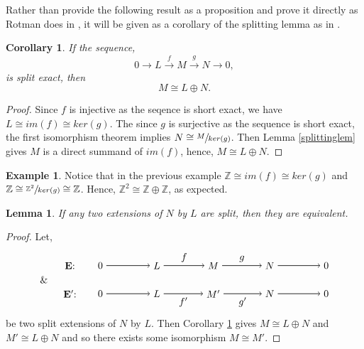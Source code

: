 \documentclass[11.5pt, twoside, a4paper, titlepage]{report}
\providecommand{\bb}[1]{\mathbb{#1}}
\theoremstyle{definition}
\newtheorem{eg}[mydef]{Example}
\theoremstyle{plain}
\newtheorem{lem}[mydef]{Lemma}
\newtheorem{cor}[mydef]{Corollary}
\begin{document}
Rather than provide the following result as a proposition and prove it directly as Rotman does in \cite{Rotman}, it will be given as a corollary of the splitting lemma as in \cite{Schiff}.

\begin{cor} \label{MLNcor}
If the sequence,
\begin{equation*}
0\xrightarrow{}L\xrightarrow{f} M \xrightarrow{g} N \xrightarrow{} 0,
\end{equation*}
is split exact, then
\begin{equation*}
M \cong L \oplus N.
\end{equation*}
\end{cor}
\begin{proof}
Since $f$ is injective as the seqence is short exact, we have $L \cong im(f) \cong ker(g)$. The since $g$ is surjective as the sequence is short exact, the first isomorphism theorem implies $N \cong \sfrac{M}{ker(g)}$. Then Lemma \ref{splittinglem} gives $M$  is a direct summand of $im(f)$, hence, $M\cong L \oplus N$.
\end{proof}

\begin{eg}
Notice that in the previous example $\bb{Z} \cong im(f)\cong ker(g) $ and $\bb{Z} \cong \sfrac{\bb{Z}^2}{ker(g)}\cong \bb{Z}$. Hence, $\bb{Z}^2 \cong \bb{Z} \oplus \bb{Z}$, as expected.
\end{eg}

\begin{lem} \label{splitequivlem}
If any two extensions of $N$ by $L$ are split, then they are equivalent.
\end{lem}
\begin{proof}
Let,
\begin{equation*}
\begin{tikzpicture}[->,-latex, auto, main path/.style={->, semithick}, main node/.style={}]
\node	[main node]		(1) at (1,0)		{$\mathbf{E}$: \quad };
\node	[main node]		(2) at (2,0)		{$0$};
\node	[main node]		(3) at (4,0)		{$L$};
\node [main node]		(4) at (6,0)		{$M$};
\node [main node]		(5) at (8,0)		{$N$};
\node	[main node]		(11) at (10,0)	{$0$};

\node [main node] 		(12) at (0,-0.5)	{\&};
\node	[main node]		(6) at (1,-1)		{$\mathbf{E'}$: \quad};
\node	[main node]		(7) at (2,-1)		{$0$};
\node	[main node]		(8) at (4,-1)		{$L$};
\node [main node]		(9) at (6,-1)		{$M'$};
\node [main node]		(10) at (8,-1)	{$N$};
\node [main node]		(13) at (10,-1)	{$0$};

\draw (2) edge [main path] node [auto] {$$} (3);
\draw (3) edge [main path] node [auto] {$f$} (4);
\draw (4) edge [main path] node [auto] {$g$} (5);
\draw (5) edge [main path] (11);

\draw (7) edge [main path] node [auto] {$$} (8);
\draw (8) edge [main path] node [auto, swap] {$f'$} (9);
\draw (9) edge [main path] node [auto, swap] {$g'$} (10);
\draw (10) edge [main path] (13);
\end{tikzpicture}
\end{equation*}
 be two split extensions of $N$ by $L$. Then Corollary \ref{MLNcor} gives $M \cong L\oplus N$ and $M'\cong L \oplus N$ and so there exists some isomorphism $M \cong M'$. 
\end{proof}
\end{document}
